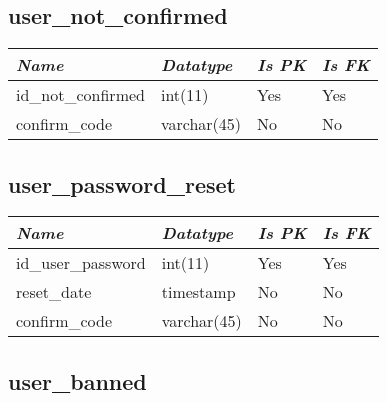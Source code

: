 \subsection{user\_not\_confirmed}

\begin{table}[h!]
\centering
\small

    \begin{tabular}{ | m{} | m{} | m{} | m{} | }
    \hline
        \cellcolor{blue!25}\textbf{\textit{Name}} &

        \cellcolor{blue!25}\textbf{\textit{Datatype}} &
        \cellcolor{blue!25}\textbf{\textit{Is PK}} &
        \cellcolor{blue!25}\textbf{\textit{Is FK}} \\
    \hline
    \hline
        id\_not\_confirmed & int(11) & Yes & Yes \\
    \hline
        confirm\_code & varchar(45) & No & No \\
    \hline
    \end{tabular}

\end{table}

\subsection{user\_password\_reset}

\begin{table}[h!]
\centering
\small

    \begin{tabular}{ | m{} | m{} | m{} | m{} | }
    \hline
        \cellcolor{blue!25}\textbf{\textit{Name}} &

        \cellcolor{blue!25}\textbf{\textit{Datatype}} &
        \cellcolor{blue!25}\textbf{\textit{Is PK}} &
        \cellcolor{blue!25}\textbf{\textit{Is FK}} \\
    \hline
    \hline
        id\_user\_password & int(11) & Yes & Yes \\
    \hline
        reset\_date & timestamp & No & No \\
    \hline
        confirm\_code & varchar(45) & No & No \\
    \hline
    \end{tabular}

\end{table}

\newpage

\subsection{user\_banned}

